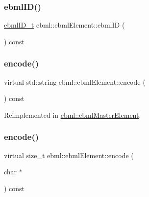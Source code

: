 \mbox{\label{classebml_1_1ebmlElement_afb2aa40757e663892d3a079de0f4e7d6}} 
\subsubsection{\texorpdfstring{ebml\+I\+D()}{ebmlID()}}
{\footnotesize\ttfamily \mbox{\hyperlink{namespaceebml_a86c5f604ddf12a74aa9812e997a58691}{ebml\+I\+D\+\_\+t}} ebml\+::ebml\+Element\+::ebml\+ID (\begin{DoxyParamCaption}{ }\end{DoxyParamCaption}) const}

\mbox{\label{classebml_1_1ebmlElement_aaeddd5ffc1da2f3d4f2a9c9ec1dbed4d}} 
\subsubsection{\texorpdfstring{encode()}{encode()}\hspace{0.1cm}{\footnotesize\ttfamily [1/4]}}
{\footnotesize\ttfamily virtual std\+::string ebml\+::ebml\+Element\+::encode (\begin{DoxyParamCaption}{ }\end{DoxyParamCaption}) const\hspace{0.3cm}{\ttfamily [virtual]}}



Reimplemented in \mbox{\hyperlink{classebml_1_1ebmlMasterElement_a2016b30a9ac7d48e990a6a864138a362}{ebml\+::ebml\+Master\+Element}}.

\mbox{\label{classebml_1_1ebmlElement_a5aeddfac34c2c839873146be6c634aed}} 
\subsubsection{\texorpdfstring{encode()}{encode()}\hspace{0.1cm}{\footnotesize\ttfamily [2/4]}}
{\footnotesize\ttfamily virtual size\+\_\+t ebml\+::ebml\+Element\+::encode (\begin{DoxyParamCaption}\item[{char $\ast$}]{ }\end{DoxyParamCaption}) const\hspace{0.3cm}{\ttfamily [virtual]}}



